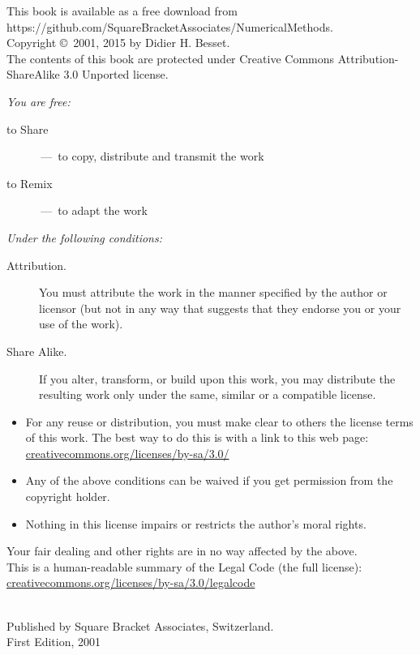 \documentclass[twoside]{book}
\begin{document}
\begin{footnotesize}
\setlength{\parindent}{0pt}
This book is available as a free download from https://github.com/SquareBracketAssociates/NumericalMethods.\\[1cm]

Copyright \copyright~2001, 2015 by Didier H. Besset.\\[1cm]

The contents of this book are protected under Creative Commons Attribution-ShareAlike 3.0 Unported license.

\emph{You are free:}
\begin{description}
  \item[to Share] \,---\, to copy, distribute and transmit the work
  \item[to Remix] \,---\, to adapt the work
\end{description}
\emph{Under the following conditions:}
\begin{description}
  \item[Attribution.] You must attribute the work in the manner specified by the author or licensor (but not in any way that suggests that they endorse you or your use of the work).
  \item[Share Alike.] If you alter, transform, or build upon this work, you may distribute the resulting work only under the same, similar or a compatible license.
\end{description}
\begin{itemize}
  \item For any reuse or distribution, you must make clear to others the license terms of this work. The best way to do this is with a link to this web page:
  \url{creativecommons.org/licenses/by-sa/3.0/}
  \item Any of the above conditions can be waived if you get permission from the copyright holder.
  \item Nothing in this license impairs or restricts the author's moral rights.
\end{itemize}
\quad
\parbox{\textwidth}{
	Your fair dealing and other rights are in no way affected by the above.\\
	This is a human-readable summary of the Legal Code (the full license):\\
	\url{creativecommons.org/licenses/by-sa/3.0/legalcode}}\\[1cm]
Published by Square Bracket Associates, Switzerland.\\
First Edition, 2001
\end{footnotesize}
\vfill
\end{document}
